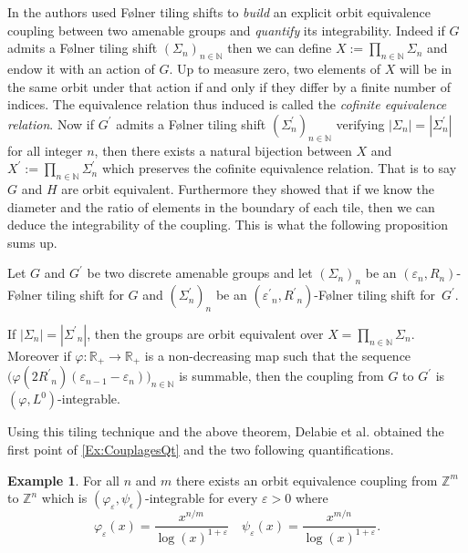 \documentclass[english, 11pt, a4paper]{article}
\newcommand{\deffont}[1]{\emph{#1}}
\theoremstyle{definition}
\newtheorem{Ex}[Def]{Example}
\numberwithin{equation}{section}
\newcommand{\bN}{\mathbb{N}}
\newcommand{\bZ}{\mathbb{Z}}
\newcommand{\bR}{\mathbb{R}}
\begin{document}
In \cite{DKLMT} the authors used Følner tiling shifts to \emph{build} an explicit
orbit equivalence coupling between two amenable groups and \emph{quantify} its
integrability. Indeed if $G$ admits a
Følner tiling shift $(\Sigma_n)_{n\in \bN}$ then we can define $X:=\prod_{n\in \bN}
\Sigma_n$ and endow it with an action of $G$. Up to measure zero, two elements of
$X$ will be in the same orbit under that action if and only if they differ by
a finite number of indices. The equivalence relation thus induced is called the
\deffont{cofinite equivalence relation}. Now if $G^\prime$ admits a Følner
tiling shift $(\Sigma^{\prime}_n)_{n\in \bN}$ verifying
$|\Sigma_n|=|\Sigma^{\prime}_n|$ for all integer $n$, then there exists a
natural bijection between $X$ and $X^{\prime}:=\prod_{n\in
  \bN}\Sigma^{\prime}_n$ which preserves the cofinite equivalence relation. That
is to say $G$ and $H$ are orbit equivalent.
Furthermore they showed that if we know
the diameter and the ratio of elements in the boundary of each tile, then we can deduce
the integrability of the coupling. This is what the following proposition sums up.

\begin{Th} \label{Prop:ConditionpourOE} Let $G$ and
  $G^\prime$ be two discrete amenable groups and let $(\Sigma_n)_n$ be an
  $(\varepsilon_n,R_n)$-Følner tiling shift for $G$ and
  $(\Sigma^\prime_n)_n$ be an $({\varepsilon^\prime}_n,{R^\prime}_n)$-Følner 
  tiling shift for~${G^\prime}$.

  If $|\Sigma_n|=|{\Sigma^\prime}_n|$, then the groups are orbit equivalent over
  $X=\prod_{n\in \bN} \Sigma_n$. Moreover if $\varphi:\bR_+ \rightarrow \bR_+$
  is a non-decreasing map such that the sequence $\big( \varphi(2
    {R^\prime}_n)\left( \varepsilon_{n-1} -\varepsilon_n \right) \big)_{n\in
    \bN}$ is summable, then the coupling from $G$ to $G^\prime$ is
  $(\varphi,L^0)$-integrable.
\end{Th}

Using this tiling technique and the above theorem, Delabie et al.
\cite{DKLMT} obtained the first point of \cref{Ex:CouplagesQt} and the two
following quantifications.

\begin{Ex}\label{Ex:CouplageZmZn}
  For all $n$ and $m$
  there exists an orbit equivalence coupling from $\bZ^m$ to $\bZ^n$ which is
  $(\varphi_{\varepsilon},\psi_{\epsilon})$-integrable for every $\varepsilon
  >0$ where  
   \begin{equation*}
     \varphi_{\varepsilon}(x)=\frac{x^{n/m}}{\log(x)^{1+\varepsilon}} \quad
     \psi_{\varepsilon}(x)=\frac{x^{m/n}}{\log(x)^{1+\varepsilon}}.
  \end{equation*}
\end{Ex}
\end{document}
